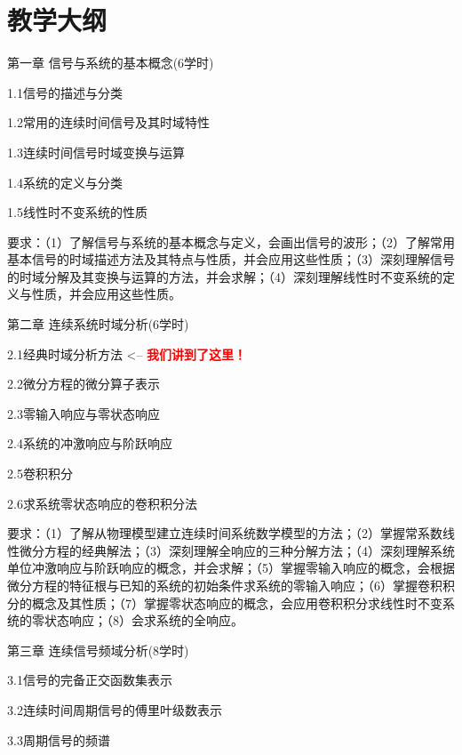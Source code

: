 \documentclass[letterpaper]{article}
\begin{document}
\section*{\textsc{教学大纲}}
第一章 \quad 信号与系统的基本概念(6学时)\par
\quad\quad 1.1信号的描述与分类\par
\quad\quad 1.2常用的连续时间信号及其时域特性\par
\quad\quad 1.3连续时间信号时域变换与运算\par
\quad\quad 1.4系统的定义与分类\par
\quad\quad 1.5线性时不变系统的性质\par
\quad\quad 要求：（1）了解信号与系统的基本概念与定义，会画出信号的波形；（2）了解常用基本信号的时域描述方法及其特点与性质，并会应用这些性质；（3）深刻理解信号的时域分解及其变换与运算的方法，并会求解；（4）深刻理解线性时不变系统的定义与性质，并会应用这些性质。\par
\vspace{1em}
第二章 \quad 连续系统时域分析(6学时)\par
\quad\quad 2.1经典时域分析方法  <-- \textcolor{red}{\textbf{我们讲到了这里！}}\par
\quad\quad 2.2微分方程的微分算子表示\par
\quad\quad 2.3零输入响应与零状态响应\par
\quad\quad 2.4系统的冲激响应与阶跃响应\par
\quad\quad 2.5卷积积分\par
\quad\quad 2.6求系统零状态响应的卷积积分法\par
\quad\quad 要求：（1）了解从物理模型建立连续时间系统数学模型的方法；（2）掌握常系数线性微分方程的经典解法；（3）深刻理解全响应的三种分解方法；（4）深刻理解系统单位冲激响应与阶跃响应的概念，并会求解；（5）掌握零输入响应的概念，会根据微分方程的特征根与已知的系统的初始条件求系统的零输入响应；（6）掌握卷积积分的概念及其性质；（7）掌握零状态响应的概念，会应用卷积积分求线性时不变系统的零状态响应；（8）会求系统的全响应。\par
\vspace{1em}
第三章 \quad 连续信号频域分析(8学时)\par
\quad\quad 3.1信号的完备正交函数集表示\par
\quad\quad 3.2连续时间周期信号的傅里叶级数表示\par
\quad\quad 3.3周期信号的频谱\par
\end{document}
